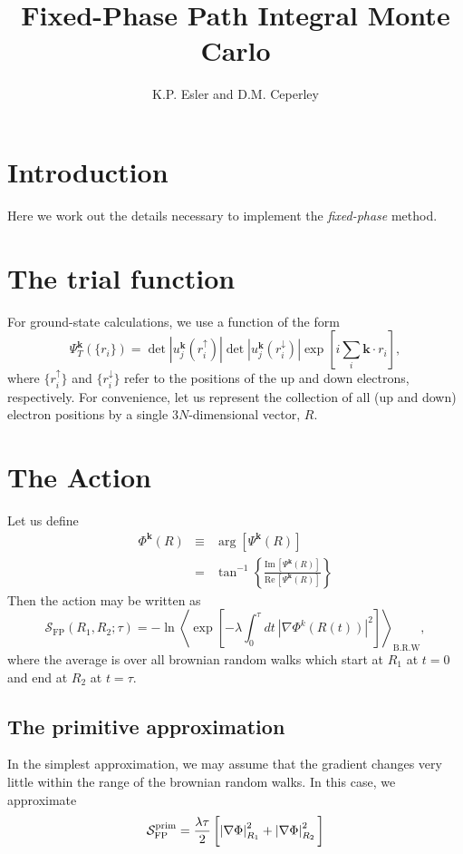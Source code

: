\documentclass{article}
\title{Fixed-Phase Path Integral Monte Carlo}
\author{K.P. Esler and D.M. Ceperley}
\begin{document}
\maketitle
\section{Introduction}
Here we work out the details necessary to implement the {\em fixed-phase} method\cite{Ortiz93}.
\section{The trial function}
For ground-state calculations, we use a function of the form
\begin{equation}
\Psi^\mathbf{k}_T(\{r_i\}) = 
\det |u^\mathbf{k}_j(r^\uparrow_i)| 
\det |u^\mathbf{k}_j(r^\downarrow_i)| 
\exp\left[i\sum_i \mathbf{k} \cdot r_i \right],
\end{equation}
where $\{r^\uparrow_i\}$ and $\{r^\downarrow_i\}$ refer to the
positions of the up and down electrons, respectively.  For
convenience, let us represent the collection of all (up and down)
electron positions by a single $3N$-dimensional vector, $R$.

\section{The Action}
Let us define
\renewcommand{\Im}{\mathrm{Im}\,}
\renewcommand{\Re}{\mathrm{Re}\,}
\begin{eqnarray}
\Phi^\mathbf{k}(R) & \equiv &\arg\left[\Psi^\mathbf{k}(R)\right] \\
& = & \tan^{-1} \left\{ \frac{\Im \left[\Psi^\mathbf{k}(R)\right]}{\Re \left[\Psi^{\mathbf{k}}(R)\right]}
\right\}
\end{eqnarray}
Then the action may be written as
\begin{equation}
\mathcal{S}_{\text{FP}}(R_1,R_2;\tau) = 
-\ln \left\langle
\exp\left[-\lambda\int_0^\tau dt\ |\nabla \Phi^{k}(R(t))|^2 \right]
\right\rangle_\text{B.R.W},
\end{equation}
where the average is over all brownian random walks which start at
$R_1$ at $t=0$ and end at $R_2$ at $t=\tau$.

\subsection{The primitive approximation}
In the simplest approximation, we may assume that the gradient changes
very little within the range of the brownian random walks.  In this
case, we approximate
\begin{equation}
\mathcal{S}_\text{FP}^\text{prim} = \frac{\lambda\tau}{2} 
\left[ \left|\nabla \Phi\right|_{R_1}^2 + \left|\nabla \Phi\right|_{R_2}^2 
\rule{0cm}{0.5cm}\right]
\end{equation}
\end{document}
